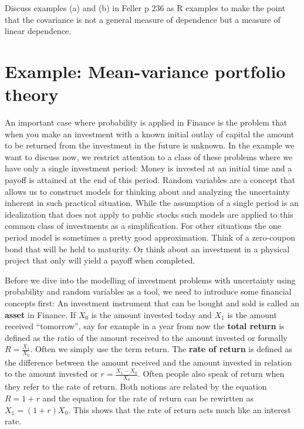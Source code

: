 \documentclass[
]{book}
\begin{document}
Discuss examples (a) and (b) in Feller p 236 as R examples to make the point that the covariance
is not a general measure of dependence but a measure of linear dependence.

\hypertarget{example-mean-variance-portfolio-theory}{%
\section{Example: Mean-variance portfolio theory}\label{example-mean-variance-portfolio-theory}}

An important case where probability is applied in Finance is the problem that when you
make an investment with a known initial outlay of capital the amount to be returned from the
investment in the future is unknown. In the example we want to discuss now, we restrict
attention to a class of these problems where we have only a single investment period: Money
is invested at an initial time and a payoff is attained at the end of this period. Random
variables are a concept that allows us to construct models for thinking about and analyzing the
uncertainty inherent in such practical situation. While the assumption of a single
period is an idealization that does not apply to public stocks such models are applied to
this common class of investments as a simplification. For other situations the one period
model is sometimes a pretty good approximation. Think of a zero-coupon bond that will be
held to maturity. Or think about an investment in a physical project that only will yield
a payoff when completed.

Before we dive into the modelling of investment problems with uncertainty using probability and
random variables as a tool, we need to introduce some financial concepts first: An
investment instrument that can be bought and sold is called an \textbf{asset} in Finance. If \(X_0\) is
the amount invested today and \(X_1\) is the amount received ``tomorrow'', say for example in a
year from now the \textbf{total return} is defined as the ratio of the amount received to
the amount invested or formally \(R = \frac{X_1}{X_0}\). Often we simply use the term return.
The \textbf{rate of return} is defined as the difference between the amount received and the amount
invested in relation to the amount invested or \(r = \frac{X_1-X_0}{X_0}\). Often people also
speak of return when they refer to the rate of return. Both notions are related by the
equation \(R = 1+r\) and the equation for the rate of return can be rewirtten as \(X_1 = (1+r)X_0\).
This shows that the rate of return acts much like an interest rate.
\end{document}
